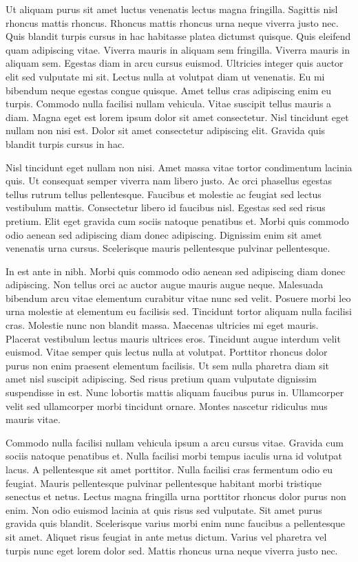 \documentclass[11pt,a4paper]{article}
\begin{document}
Ut aliquam purus sit amet luctus venenatis lectus magna fringilla. Sagittis nisl rhoncus mattis rhoncus. Rhoncus mattis rhoncus urna neque viverra justo nec. Quis blandit turpis cursus in hac habitasse platea dictumst quisque. Quis eleifend quam adipiscing vitae. Viverra mauris in aliquam sem fringilla. Viverra mauris in aliquam sem. Egestas diam in arcu cursus euismod. Ultricies integer quis auctor elit sed vulputate mi sit. Lectus nulla at volutpat diam ut venenatis. Eu mi bibendum neque egestas congue quisque. Amet tellus cras adipiscing enim eu turpis. Commodo nulla facilisi nullam vehicula. Vitae suscipit tellus mauris a diam. Magna eget est lorem ipsum dolor sit amet consectetur. Nisl tincidunt eget nullam non nisi est. Dolor sit amet consectetur adipiscing elit. Gravida quis blandit turpis cursus in hac.

Nisl tincidunt eget nullam non nisi. Amet massa vitae tortor condimentum lacinia quis. Ut consequat semper viverra nam libero justo. Ac orci phasellus egestas tellus rutrum tellus pellentesque. Faucibus et molestie ac feugiat sed lectus vestibulum mattis. Consectetur libero id faucibus nisl. Egestas sed sed risus pretium. Elit eget gravida cum sociis natoque penatibus et. Morbi quis commodo odio aenean sed adipiscing diam donec adipiscing. Dignissim enim sit amet venenatis urna cursus. Scelerisque mauris pellentesque pulvinar pellentesque.

In est ante in nibh. Morbi quis commodo odio aenean sed adipiscing diam donec adipiscing. Non tellus orci ac auctor augue mauris augue neque. Malesuada bibendum arcu vitae elementum curabitur vitae nunc sed velit. Posuere morbi leo urna molestie at elementum eu facilisis sed. Tincidunt tortor aliquam nulla facilisi cras. Molestie nunc non blandit massa. Maecenas ultricies mi eget mauris. Placerat vestibulum lectus mauris ultrices eros. Tincidunt augue interdum velit euismod. Vitae semper quis lectus nulla at volutpat. Porttitor rhoncus dolor purus non enim praesent elementum facilisis. Ut sem nulla pharetra diam sit amet nisl suscipit adipiscing. Sed risus pretium quam vulputate dignissim suspendisse in est. Nunc lobortis mattis aliquam faucibus purus in. Ullamcorper velit sed ullamcorper morbi tincidunt ornare. Montes nascetur ridiculus mus mauris vitae.

Commodo nulla facilisi nullam vehicula ipsum a arcu cursus vitae. Gravida cum sociis natoque penatibus et. Nulla facilisi morbi tempus iaculis urna id volutpat lacus. A pellentesque sit amet porttitor. Nulla facilisi cras fermentum odio eu feugiat. Mauris pellentesque pulvinar pellentesque habitant morbi tristique senectus et netus. Lectus magna fringilla urna porttitor rhoncus dolor purus non enim. Non odio euismod lacinia at quis risus sed vulputate. Sit amet purus gravida quis blandit. Scelerisque varius morbi enim nunc faucibus a pellentesque sit amet. Aliquet risus feugiat in ante metus dictum. Varius vel pharetra vel turpis nunc eget lorem dolor sed. Mattis rhoncus urna neque viverra justo nec.
\end{document}
